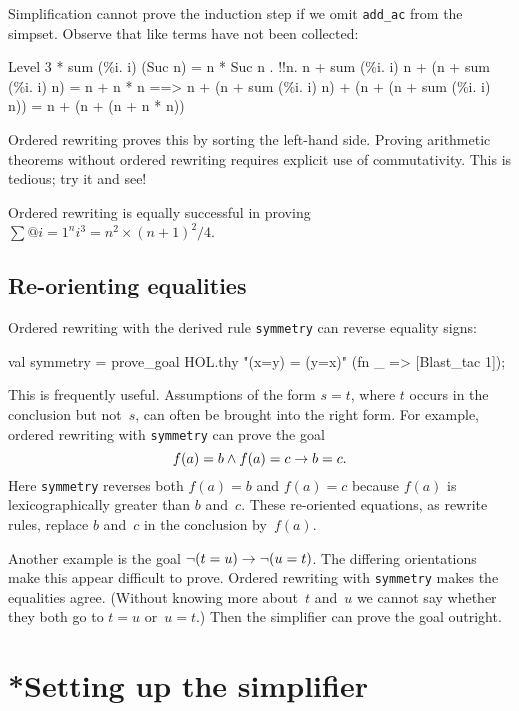 Simplification cannot prove the induction step if we omit {\tt add_ac} from
the simpset.  Observe that like terms have not been collected:
\begin{ttbox}
{\out Level 3}
{ * sum (\%i. i) (Suc n) = n * Suc n}
{. !!n. n + sum (\%i. i) n + (n + sum (\%i. i) n) = n + n * n}
{\out           ==> n + (n + sum (\%i. i) n) + (n + (n + sum (\%i. i) n)) =}
{\out               n + (n + (n + n * n))}
\end{ttbox}
Ordered rewriting proves this by sorting the left-hand side.  Proving
arithmetic theorems without ordered rewriting requires explicit use of
commutativity.  This is tedious; try it and see!

Ordered rewriting is equally successful in proving
$\sum@{i=1}^n i^3 = n^2\times(n+1)^2/4$.


\subsection{Re-orienting equalities}
Ordered rewriting with the derived rule {\tt symmetry} can reverse equality
signs:
\begin{ttbox}
val symmetry = prove_goal HOL.thy "(x=y) = (y=x)"
                 (fn _ => [Blast_tac 1]);
\end{ttbox}
This is frequently useful.  Assumptions of the form $s=t$, where $t$ occurs
in the conclusion but not~$s$, can often be brought into the right form.
For example, ordered rewriting with {\tt symmetry} can prove the goal
\[ f(a)=b \wedge f(a)=c \rightarrow b=c. \]
Here {\tt symmetry} reverses both $f(a)=b$ and $f(a)=c$
because $f(a)$ is lexicographically greater than $b$ and~$c$.  These
re-oriented equations, as rewrite rules, replace $b$ and~$c$ in the
conclusion by~$f(a)$. 

Another example is the goal $\neg(t=u) \rightarrow \neg(u=t)$.
The differing orientations make this appear difficult to prove.  Ordered
rewriting with {\tt symmetry} makes the equalities agree.  (Without
knowing more about~$t$ and~$u$ we cannot say whether they both go to $t=u$
or~$u=t$.)  Then the simplifier can prove the goal outright.



\section{*Setting up the simplifier}\label{sec:setting-up-simp}

